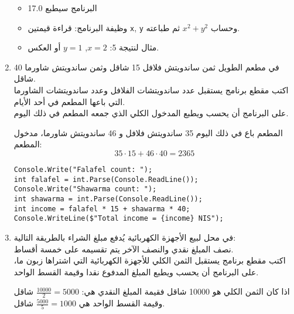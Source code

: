 ﻿\documentclass[12pt]{article}
\begin{document}
\begin{enumerate}[itemsep=2em]
\ifwithsols
\begin{boxSolution}
\begin{itemize}
    \item البرنامج سيطبع 17.0
  \item وظيفة البرنامج: قراءة قيمتين \texttt{x}, \texttt{y} وحساب \(x^2 + y^2\) ثم طباعته.
  \item مثال لنتيجة 5: \(x = 2\), \(y = 1\) أو العكس.
\end{itemize}
\end{boxSolution}
\fi

\clearpage
\item
    في مطعم الطويل ثمن ساندويتش فلافل 15 شاقل وثمن ساندويتش شاورما 40 شاقل. \\
    اكتب مقطع برنامج يستقبل عدد ساندويتشات الفلافل وعدد ساندويتشات الشاورما التي باعها المطعم في أحد الأيام. \\
    على البرنامج أن يحسب ويطبع المدخول الكلي الذي جمعه المطعم في ذلك اليوم. \\
    \begin{boxExample}
        المطعم باع في ذلك اليوم 35 ساندويتش فلافل و 46 ساندويتش شاورما، مدخول المطعم: \\
        $$35 \cdot 15 + 46 \cdot 40 = 2365$$
    \end{boxExample}

\ifwithsols
\begin{boxSolution}
\begin{english}
\begin{verbatim}
Console.Write("Falafel count: ");
int falafel = int.Parse(Console.ReadLine());
Console.Write("Shawarma count: ");
int shawarma = int.Parse(Console.ReadLine());
int income = falafel * 15 + shawarma * 40;
Console.WriteLine($"Total income = {income} NIS");
\end{verbatim}
\end{english}
\end{boxSolution}
\clearpage
\fi

    \item
    في محل لبيع الأجهزة الكهربائية يُدفع مبلغ الشراء بالطريقة التالية: \\
     نصف المبلغ نقدي والنصف الآخر يتم تقسيمه على خمسة أقساط. \\
      اكتب مقطع برنامج يستقبل الثمن الكلي للأجهزة الكهربائية التي اشتراها زبون ما، على البرنامج أن يحسب ويطبع المبلغ المدفوع نقدا وقيمة القسط الواحد.  \\
    \begin{boxExample}
        اذا كان الثمن الكلي هو 10000 شاقل فقيمة المبلغ النقدي هي: $\frac{10000}{2}=5000$ شاقل وقيمة القسط الواحد هي $\frac{5000}{5}=1000$ شاقل.
    \end{boxExample}


\end{enumerate}
\end{document}
